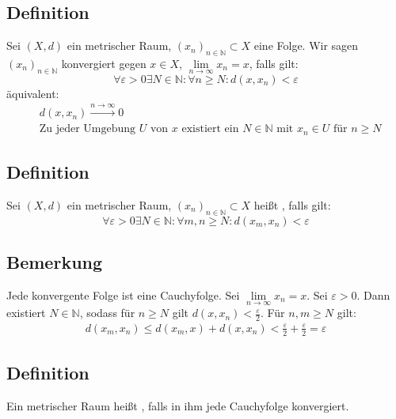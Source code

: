 
\subsection[Definition von Folgenkonvergenz in metrischen Räumen]{Definition} %
\label{sub:212}
Sei $(X,d)$ ein metrischer Raum, $(x_n)_{n \in \mathds{N}} \subset X$ eine Folge. Wir sagen $(x_n)_{n \in \mathds{N}}$ konvergiert gegen $x \in X$,
$\lim\limits_{ n \to \infty} x_n = x$, falls gilt: 
\[
	\forall \varepsilon >0 \exists N \in \mathds{N} : \forall n \ge N : d(x,x_n) < \varepsilon \tag{$\star$}
\]
äquivalent:
\begin{align*}
	& d(x,x_n) \xrightarrow{n \to \infty} 0 \tag{$\star \star$} \\
	& \text{Zu jeder Umgebung $U$ von $x$ existiert ein $N \in \mathds{N}$ mit $x_n \in U$ für $n \ge N$} \tag{$\star \star \star$}
\end{align*}

\subsection[Definition: Cauchyfolgen in metrischen Räumen]{Definition} %
\label{sub:213}
Sei $(X,d)$ ein metrischer Raum, $(x_n)_{n \in \mathds{N}} \subset X$ heißt , falls gilt:
\[
	\forall \varepsilon > 0 \exists N  \in \mathds{N} : \forall m,n \ge N : d(x_m, x_n) < \varepsilon
\]

\subsection[Bemerkung: Jede konvergente Folge ist Cauchy]{Bemerkung} %
\label{sub:214}
Jede konvergente Folge ist eine Cauchyfolge.
Sei $\lim\limits_{ n \to \infty} x_n = x$. Sei $\varepsilon >0$. Dann existiert $N \in \mathds{N}$, sodass für $n \ge N$ gilt $d(x,x_n) < \frac{\varepsilon}{2}$.
Für $n,m \ge N$ gilt:
\begin{align*}
	d(x_m, x_n) \le d(x_m, x) + d(x,x_n) < \frac{\varepsilon}{2} + \frac{\varepsilon}{2} = \varepsilon \tag*{$\square$}  
\end{align*}

\subsection[Definition von Vollständigkeit eines metrischen Raumes]{Definition} %
\label{sub:215}
Ein metrischer Raum heißt , falls in ihm jede Cauchyfolge konvergiert. 

